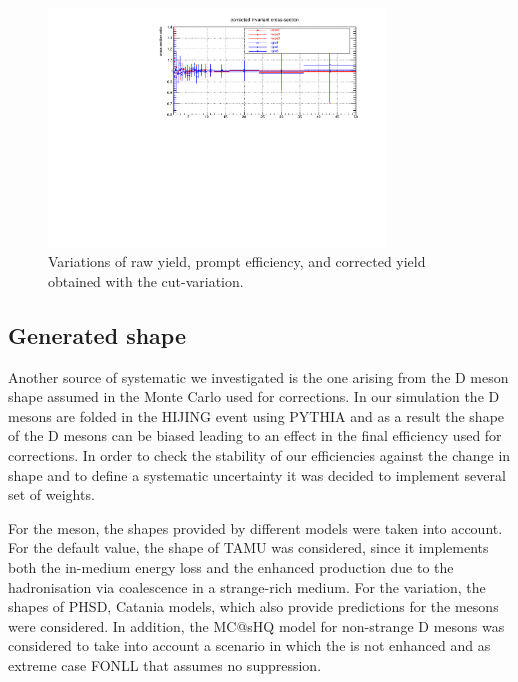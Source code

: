 \begin{figure}[tb]
\begin{center}
 \includegraphics[width=0.8\textwidth]{figures/Dstar/pp13TeV/corrected-yield-ratio-cut-var-v2.pdf}
\caption{Variations of raw yield, prompt  efficiency, and corrected yield obtained with the cut-variation.}
\label{fig:DstarCutVar010}
\end{center}
\end{figure}


\clearpage
\subsection{Generated \pt shape}
\label{sec:gen_pt_syst}
Another source of systematic we investigated is the one arising from the D meson \pt shape assumed in the Monte Carlo used for corrections. In our simulation the D mesons are folded in the HIJING event using PYTHIA and as a result the \pt shape of the D mesons can be biased leading to an effect in the final efficiency used for corrections. In order to check the stability of our efficiencies against the change in \pt shape and to define a systematic uncertainty it was decided to implement several set of weights. 

For the \Dsubs meson, the \pt shapes provided by different models were taken into account. For the default value, the \pt shape of TAMU was considered, since it implements both the in-medium energy loss and the enhanced \Dsubs production due to the hadronisation via coalescence in a strange-rich medium. For the variation, the shapes of PHSD, Catania models, which also provide predictions for the \Dsubs mesons were considered. In addition, the MC@sHQ model for non-strange D mesons was considered to take into account a scenario in which the \Dsubs is not enhanced and as extreme case FONLL that assumes no suppression. 

